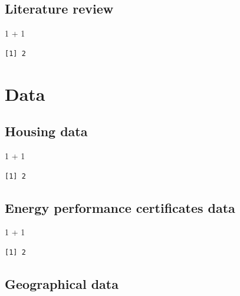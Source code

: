 \documentclass[
  letterpaper,
  DIV=11,
  numbers=noendperiod]{scrreprt}
\newenvironment{Shaded}{\begin{snugshade}}{\end{snugshade}}
\newcommand{\DecValTok}[1]{\textcolor[rgb]{0.68,0.00,0.00}{#1}}
\newcommand{\SpecialCharTok}[1]{\textcolor[rgb]{0.37,0.37,0.37}{#1}}
\begin{document}

\chapter{Literature review}\label{literature-review}

\begin{Shaded}
\begin{Highlighting}[]
\DecValTok{1} \SpecialCharTok{+} \DecValTok{1}
\end{Highlighting}
\end{Shaded}

\begin{verbatim}
[1] 2
\end{verbatim}

\part{Data}

\chapter{Housing data}\label{housing-data}

\begin{Shaded}
\begin{Highlighting}[]
\DecValTok{1} \SpecialCharTok{+} \DecValTok{1}
\end{Highlighting}
\end{Shaded}

\begin{verbatim}
[1] 2
\end{verbatim}

\chapter{Energy performance certificates
data}\label{energy-performance-certificates-data}

\begin{Shaded}
\begin{Highlighting}[]
\DecValTok{1} \SpecialCharTok{+} \DecValTok{1}
\end{Highlighting}
\end{Shaded}

\begin{verbatim}
[1] 2
\end{verbatim}

\chapter{Geographical data}\label{geographical-data}
\end{document}

